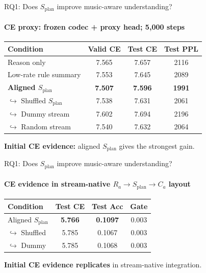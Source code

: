 \documentclass[aspectratio=169,11pt]{beamer}
\newcommand{\splan}{$S_{\mathrm{plan}}$}
\newcommand{\hook}{$\hookrightarrow$}
\begin{document}
\begin{frame}{RQ1: Does \splan{} improve music-aware understanding?}
  \framesubtitle{CE proxy: frozen codec + proxy head; 5{,}000 steps}

  {\small
  \begin{tabular}{p{4.0cm}ccc}
    \toprule
    \textbf{Condition} & \textbf{Valid CE} & \textbf{Test CE} & \textbf{Test PPL} \\
    \midrule
    Reason only            & 7.565 & 7.657 & 2116 \\
    Low-rate rule summary  & 7.553 & 7.645 & 2089 \\
    \rowcolor{HLrow}
    \textbf{Aligned \splan{}} & \textbf{7.507} & \textbf{7.596} & \textbf{1991} \\
    \hook{} Shuffled \splan{} & 7.538 & 7.631 & 2061 \\
    \hook{} Dummy stream      & 7.602 & 7.694 & 2196 \\
    \hook{} Random stream     & 7.540 & 7.632 & 2064 \\
    \bottomrule
  \end{tabular}}

  \smallskip
  \begin{tcolorbox}[good]
    \textbf{Initial CE evidence:} aligned \splan{} gives the strongest gain.
  \end{tcolorbox}
\end{frame}

\begin{frame}{RQ1: Does \splan{} improve music-aware understanding?}
  \framesubtitle{CE evidence in stream-native $R_a \to S_{\mathrm{plan}} \to C_a$ layout}

  {\small
  \begin{tabular}{p{4.0cm}ccc}
    \toprule
    \textbf{Condition} & \textbf{Test CE} & \textbf{Test Acc} & \textbf{Gate} \\
    \midrule
    \rowcolor{HLrow}
    Aligned \splan{}  & \textbf{5.766} & \textbf{0.1097} & 0.003 \\
    \hook{} Shuffled  & 5.785 & 0.1067 & 0.003 \\
    \hook{} Dummy     & 5.785 & 0.1068 & 0.003 \\
    \bottomrule
  \end{tabular}}

  \smallskip
  \begin{tcolorbox}[good]
    \textbf{Initial CE evidence replicates} in stream-native integration.
  \end{tcolorbox}
\end{frame}
\end{document}
